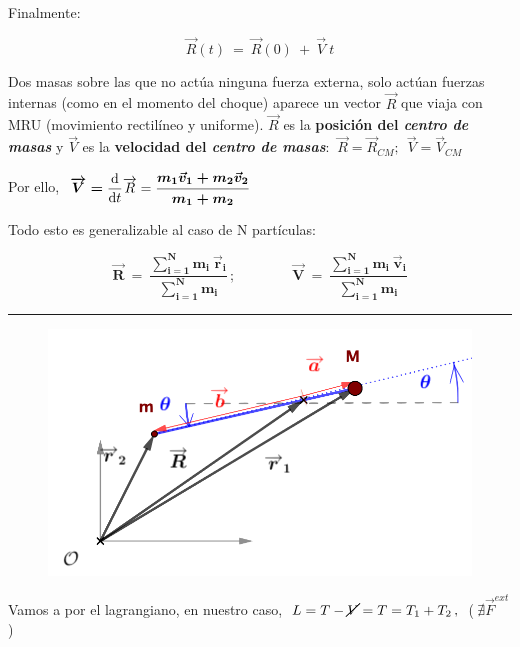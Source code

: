  Finalmente: 
 
 \begin{equation}
 \overrightarrow R(t) \ = \ \overrightarrow R(0) \ + \ \overrightarrow V \ t	
 \end{equation}
 
 Dos masas sobre las que no actúa ninguna fuerza externa, solo actúan fuerzas internas (como en el momento del choque) aparece un vector $\overrightarrow R$ que viaja con MRU \textcolor{gris}{(movimiento rectilíneo y uniforme)}. $\overrightarrow R$ es la \textbf{posición del \emph{centro de masas}} y $\overrightarrow V$ es la \textbf{velocidad del \emph{centro de masas}}: $\ \overrightarrow R=\overrightarrow R_{CM};\ \ \overrightarrow V=\overrightarrow V_{CM}$
 
 Por ello, $\ \boldsymbol{ \overrightarrow V= }\displaystyle \dv{t} \overrightarrow R = \boldsymbol{ \dfrac{m_1\vec v_1 + m_2 \vec v_2}{m_1+m_2} }$
 
 Todo esto es generalizable al caso de N partículas:
 
 \begin{equation}
 \boldsymbol{
 \overrightarrow R \ =  \  \dfrac{ \displaystyle \sum_{i=1}^N m_i \ \vec r_i	}{ \displaystyle \sum_{i=1}^N m_i} \, ; \qquad  \qquad
  \overrightarrow V \ =  \  \dfrac{ \displaystyle \sum_{i=1}^N m_i \ \vec v_i	}{\displaystyle \sum_{i=1}^N m_i}
  }
 \end{equation}

\begin{flushright} \rule{300pt}{0.1pt}	\end{flushright}



	\begin{figure}[H]
	\centering
	\includegraphics[width=.6\textwidth]{imagenes/img05-03.png}
	\end{figure}
	


Vamos a por el lagrangiano, en nuestro caso, $ \ L=T-\cancel{V}=T =T_1+T_2\, , \ $  \textcolor{gris}{($\  \nexists  \overrightarrow F^{ext}$ )}

